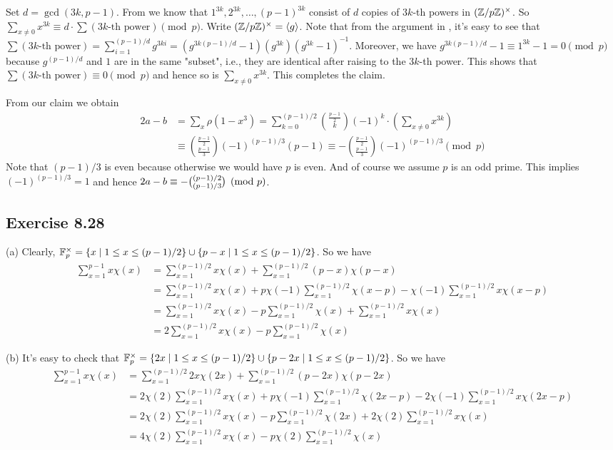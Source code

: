 \documentclass[../I&R.tex]{subfiles}
\begin{document}
Set $d=\gcd(3k,p-1)$. From  we know that $1^{3k},2^{3k},\ldots,(p-1)^{3k}$ consist of $d$ copies of $3k$-th powers in $(\mathbb{Z}/p\mathbb{Z})^\times$. So $\sum_{x\neq0} x^{3k}\equiv d\cdot\sum (3k\text{-th power}) \pmod{p}$. Write $(\mathbb{Z}/p\mathbb{Z})^\times=\langle g\rangle$. Note that from the argument in , it's easy to see that $\sum (3k\text{-th power}) = \sum_{i=1}^{(p-1)/d} g^{3ki} = (g^{3k(p-1)/d}-1)(g^{3k})(g^{3k}-1)^{-1}$. Moreover, we have $g^{3k(p-1)/d}-1\equiv 1^{3k}-1=0\pmod{p}$ because $g^{(p-1)/d}$ and $1$ are in the same "subset", i.e., they are identical after raising to the $3k$-th power. This shows that $\sum (3k\text{-th power}) \equiv0\pmod{p}$ and hence so is $\sum_{x\neq0} x^{3k}$. This completes the claim.

From our claim we obtain
\begin{align*}
2a-b &= \sum_x \rho(1-x^3) = \sum_{k=0}^{(p-1)/2}\binom{\frac{p-1}{2}}{k}(-1)^k\cdot\left(\sum_{x\neq0} x^{3k}\right) \\
&\equiv \binom{\frac{p-1}{2}}{\frac{p-1}{3}}(-1)^{(p-1)/3}(p-1) \equiv -\binom{\frac{p-1}{2}}{\frac{p-1}{3}}(-1)^{(p-1)/3} \pmod{p}
\end{align*}
Note that $(p-1)/3$ is even because otherwise we would have $p$ is even. And of course we assume $p$ is an odd prime. This implies $(-1)^{(p-1)/3}=1$ and hence $2a-b\equiv -\tbinom{(p-1)/2}{(p-1)/3} \pmod{p}$.


\subsection*{Exercise 8.28}

(a) Clearly, $\mathbb{F}_p^\times = \{x\mid 1\leq x\leq (p-1)/2\}\cup\{p-x\mid 1\leq x\leq(p-1)/2\}$. So we have
\begin{align*}
\sum_{x=1}^{p-1} x\chi(x) &= \sum_{x=1}^{(p-1)/2} x\chi(x) + \sum_{x=1}^{(p-1)/2} (p-x)\chi(p-x) \\
&= \sum_{x=1}^{(p-1)/2} x\chi(x) + p\chi(-1)\sum_{x=1}^{(p-1)/2} \chi(x-p) - \chi(-1)\sum_{x=1}^{(p-1)/2} x\chi(x-p) \\
&= \sum_{x=1}^{(p-1)/2} x\chi(x) - p\sum_{x=1}^{(p-1)/2} \chi(x) + \sum_{x=1}^{(p-1)/2} x\chi(x) \\
&= 2\sum_{x=1}^{(p-1)/2} x\chi(x) - p\sum_{x=1}^{(p-1)/2} \chi(x)
\end{align*}

(b) It's easy to check that $\mathbb{F}_p^\times = \{2x\mid 1\leq x\leq (p-1)/2\}\cup\{p-2x\mid 1\leq x\leq(p-1)/2\}$. So we have
\begin{align*}
\sum_{x=1}^{p-1} x\chi(x) &= \sum_{x=1}^{(p-1)/2} 2x\chi(2x) + \sum_{x=1}^{(p-1)/2} (p-2x)\chi(p-2x) \\
&= 2\chi(2)\sum_{x=1}^{(p-1)/2} x\chi(x) + p\chi(-1)\sum_{x=1}^{(p-1)/2} \chi(2x-p) - 2\chi(-1)\sum_{x=1}^{(p-1)/2} x\chi(2x-p) \\
&= 2\chi(2)\sum_{x=1}^{(p-1)/2} x\chi(x) - p\sum_{x=1}^{(p-1)/2} \chi(2x) + 2\chi(2)\sum_{x=1}^{(p-1)/2} x\chi(x) \\
&= 4\chi(2)\sum_{x=1}^{(p-1)/2} x\chi(x) - p\chi(2)\sum_{x=1}^{(p-1)/2} \chi(x) 
\end{align*}
\end{document}
